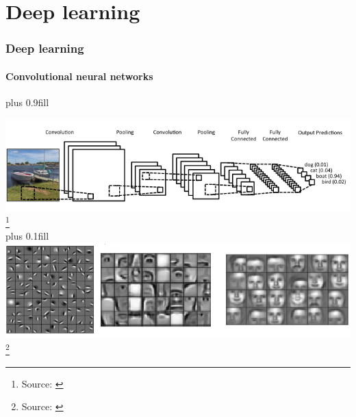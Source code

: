 \section{Deep learning}
\begin{frame}[t]\frametitle{Deep learning}
\framesubtitle{Convolutional neural networks}
\vskip0pt plus 0.9fill
\begin{center}
    \includegraphics[width=\linewidth]{cnnlayout.png} \footnote{Source: \cite{clarifai}}\\
    \vskip0pt plus 0.1fill
    \includegraphics[width=\linewidth]{cnnfeatures.png} \footnote{Source: \cite{conf/icml/LeeGRN09}}
\end{center}
\end{frame}

